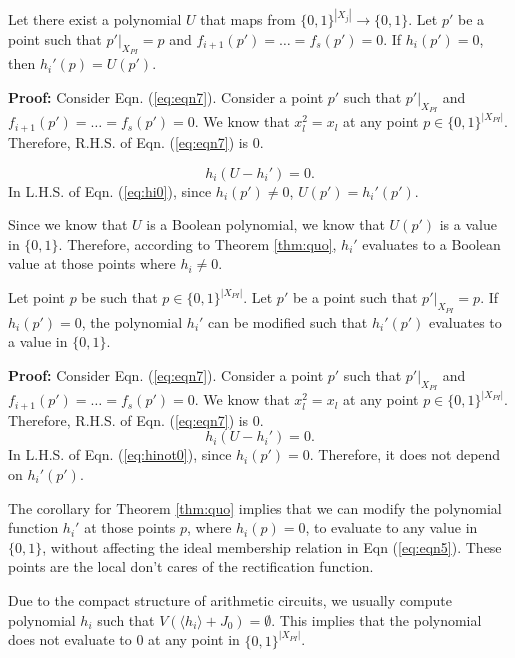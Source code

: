 \begin{Theorem}
Let there exist a polynomial $U$ that maps from $\{0,1\}^{|X_j|} \rightarrow \{0,1\}$. Let $p'$ be a point such that $p'|_{X_{PI}} = p$ and $f_{i+1}(p') = \dots = f_s(p') = 0$. If $h_i(p') = 0$, then $h_i'(p) = U(p')$.
\label{thm:quo}
\end{Theorem}

\textbf{Proof:}
Consider Eqn. (\ref{eq:eqn7}). Consider a point $p'$ such that $p'|_{X_{PI}}$ and $f_{i+1}(p') = \dots = f_s(p') = 0$. We know that $x_l^2 = x_l$ at any point $p \in \{0,1\}^{|X_{PI}|}$. Therefore, R.H.S. of Eqn. (\ref{eq:eqn7}) is 0.

\begin{equation}
    h_i(U - h_i') = 0. 
    \label{eq:hi0}
\end{equation}
In L.H.S. of Eqn. (\ref{eq:hi0}), since $h_i(p') \neq 0$, $U(p') = h_i'(p')$. 

Since we know that $U$ is a Boolean polynomial, we know that $U(p')$ is a value in $\{0,1\}$. Therefore, according to Theorem \ref{thm:quo}, $h_i'$ evaluates to a Boolean value at those points where $h_i \neq 0$. 

\begin{Corollary}
Let point $p$ be such that $p \in \{0,1\}^{|X_{PI}|}$. Let $p'$ be a point such that $p'|_{X_{PI}} = p$. If $h_i(p') = 0$, the polynomial $h_i'$ can be modified such that $h_i'(p')$ evaluates to a value in $\{0,1\}$.
\end{Corollary}

\textbf{Proof:} Consider Eqn. (\ref{eq:eqn7}). Consider a point $p'$ such that $p'|_{X_{PI}}$ and $f_{i+1}(p') = \dots = f_s(p') = 0$. We know that $x_l^2 = x_l$ at any point $p \in \{0,1\}^|X_{PI}|$. Therefore, R.H.S. of Eqn. (\ref{eq:eqn7}) is 0.
\begin{equation}
    h_i(U - h_i') = 0. 
    \label{eq:hinot0}
\end{equation}
In L.H.S. of Eqn. (\ref{eq:hinot0}), since $h_i(p') = 0$. Therefore, it does not depend on $h_i'(p')$. 

The corollary for Theorem \ref{thm:quo} implies that we can modify
the polynomial function $h_i'$ at those points $p$, where $h_i(p) = 0$, to evaluate to any
value in $\{0,1\}$, without affecting the ideal membership relation in Eqn (\ref{eq:eqn5}). These points are the local don't cares of the rectification function.

Due to the compact structure of arithmetic circuits, we usually compute polynomial $h_i$ such that $V(\langle h_i \rangle + J_0) = \emptyset$. This implies that the polynomial does not evaluate to 0 at any point in $\{0,1\}^{|X_{PI}|}$. 

